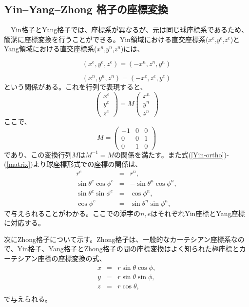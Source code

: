 \documentclass[12pt]{jsarticle}
\begin{document}
\subsection{Yin--Yang--Zhong 格子の座標変換}
　Yin格子とYang格子では、座標系が異なるが、元は同じ球座標系であるため、簡潔に座標変換を行うことができる。Yin領域における直交座標系($x^{e}$,$y^{e}$,$z^{e}$)とYang領域における直交座標系($x^{n}$,$y^{n}$,$z^{n}$)には、

\begin{equation}
\label{Yin-ortho}
(x^{e},y^{e},z^{e})=(-x^{n},z^{n},y^{n})
\end{equation}

\begin{equation}
\label{Yang-ortho}
(x^{n},y^{n},z^{n})=(-x^{e},z^{e},y^{e}) 
\end{equation}
という関係がある。これを行列で表現すると、
\begin{equation}
\label{Yin-Yang-matrix}
\begin{pmatrix}
x^{e} \\ y^{e} \\ z^{e}
\end{pmatrix} 
= 
M\begin{pmatrix}
x^{n} \\ y^{n} \\ z^{n}
\end{pmatrix}
\end{equation}
ここで、
\begin{equation}
\label{matrix}
M=
\begin{pmatrix}
-1 & 0 & 0 \\ 0 & 0 & 1 \\ 0 & 1 & 0
\end{pmatrix} 
\end{equation}
であり、この変換行列$M$は$M^{-1}=M$の関係を満たす。また式(\ref{Yin-ortho})-(\ref{matrix})より球座標形式での座標の関係は、
\begin{eqnarray}
r^{e}&=&r^{n}, \\
\sin\theta^{e}\cos\phi^{e}&=&-\sin\theta^{n}\cos\phi^{n}, \\
\sin\theta^{e}\sin\phi^{e}&=&\cos\phi^{n}, \\
\cos\phi^{e}&=&\sin\theta^{n}\sin\phi^{n}, 
\end{eqnarray}
で与えられることがわかる。ここでの添字の$n,e$はそれぞれYin座標とYang座標に対応する。

次にZhong格子について示す。Zhong格子は、一般的なカーテシアン座標系なので、Yin格子、Yang格子とZhong格子の間の座標変換はよく知られた極座標とカーテシアン座標の座標変換の式、
\begin{eqnarray}
x&=&r\sin\theta\cos\phi, \\
y&=&r\sin\theta\sin\phi, \\
z&=&r\cos\theta, \\
\end{eqnarray}
で与えられる。
\end{document}
